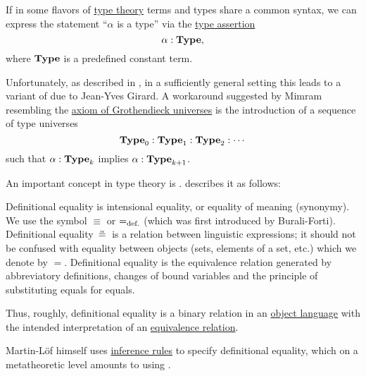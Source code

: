 \begin{remark}\label{rem:type_universes}
  If in some flavors of \hyperref[rem:type_theory]{type theory} terms and types share a common syntax, we can express the statement \enquote{\( \alpha \) is a type} via the \hyperref[def:type_assertion]{type assertion}
  \begin{equation*}
    \alpha: \op*{Type},
  \end{equation*}
  where \( \op*{Type} \) is a predefined constant term.

  Unfortunately, as described in , in a sufficiently general setting this leads to a variant of  due to Jean-Yves Girard. A workaround suggested by Mimram resembling the \hyperref[def:axiom_of_universes]{axiom of Grothendieck universes} is the introduction of a sequence of type universes
  \begin{equation*}
    \op*{Type}_0: \op*{Type}_1: \op*{Type}_2: \cdots
  \end{equation*}
  such that \( \alpha: \op*{Type}_k \) implies \( \alpha: \op*{Type}_{k+1} \).
\end{remark}

\begin{definition}\label{con:definitional_equality}
  An important concept in type theory is .  describes it as follows:
  \begin{displayquote}
    Definitional equality is intensional equality, or equality of meaning (synonymy). We use the symbol \( {\equiv} \) or \( {=_{\T{def.}}} \) (which was first introduced by Burali-Forti). Definitional equality \( {\aequiv} \) is a relation between linguistic expressions; it should not be confused with equality between objects (sets, elements of a set, etc.) which we denote by \( {=} \). Definitional equality is the equivalence relation generated by abbreviatory definitions, changes of bound variables and the principle of substituting equals for equals.
  \end{displayquote}

  Thus, roughly, definitional equality is a binary relation in an \hyperref[con:metalogic]{object language} with the intended interpretation of an \hyperref[def:equivalence_relation]{equivalence relation}.

  Martin-L\"of himself uses \hyperref[def:inference_rule]{inference rules} to specify definitional equality, which on a metatheoretic level amounts to using .
\end{definition}


